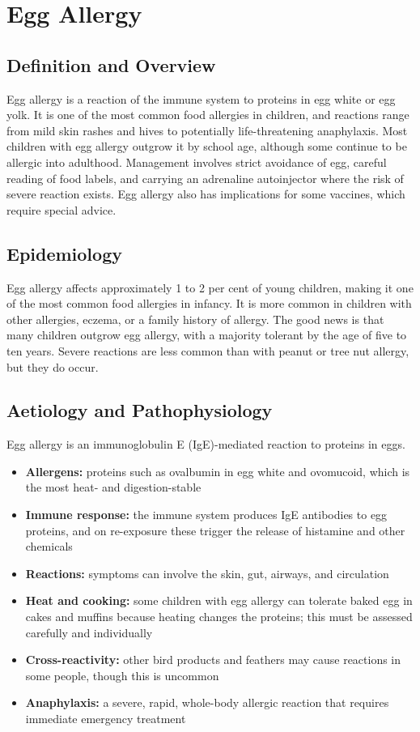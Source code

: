 \chapter{Egg Allergy}

\section*{Definition and Overview}
Egg allergy is a reaction of the immune system to proteins in egg white or egg yolk. It is one of the most common food allergies in children, and reactions range from mild skin rashes and hives to potentially life-threatening anaphylaxis. Most children with egg allergy outgrow it by school age, although some continue to be allergic into adulthood. Management involves strict avoidance of egg, careful reading of food labels, and carrying an adrenaline autoinjector where the risk of severe reaction exists. Egg allergy also has implications for some vaccines, which require special advice.

\section*{Epidemiology}
Egg allergy affects approximately 1 to 2 per cent of young children, making it one of the most common food allergies in infancy. It is more common in children with other allergies, eczema, or a family history of allergy. The good news is that many children outgrow egg allergy, with a majority tolerant by the age of five to ten years. Severe reactions are less common than with peanut or tree nut allergy, but they do occur.

\section*{Aetiology and Pathophysiology}
Egg allergy is an immunoglobulin E (IgE)-mediated reaction to proteins in eggs.
\begin{itemize}
    \item \textbf{Allergens:} proteins such as ovalbumin in egg white and ovomucoid, which is the most heat- and digestion-stable
    \item \textbf{Immune response:} the immune system produces IgE antibodies to egg proteins, and on re-exposure these trigger the release of histamine and other chemicals
    \item \textbf{Reactions:} symptoms can involve the skin, gut, airways, and circulation
    \item \textbf{Heat and cooking:} some children with egg allergy can tolerate baked egg in cakes and muffins because heating changes the proteins; this must be assessed carefully and individually
    \item \textbf{Cross-reactivity:} other bird products and feathers may cause reactions in some people, though this is uncommon
    \item \textbf{Anaphylaxis:} a severe, rapid, whole-body allergic reaction that requires immediate emergency treatment
\end{itemize}

